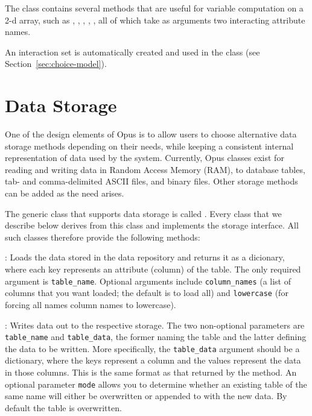 The  class contains several methods that are useful for
variable computation on a 2-d array, such as , ,
, , , all of which take 
as arguments two interacting attribute names.

An interaction set is automatically created and used in the
 class (see Section~\ref{sec:choice-model}).

\section{Data Storage}
\label{sec:data-storage}
%
One of the design elements of Opus is to allow users to choose alternative
data storage methods depending on their needs, while keeping a consistent
internal representation of data used by the system.  Currently, Opus classes
exist for reading and writing data in Random Access Memory (RAM), to database
tables, tab- and comma-delimited ASCII files, and binary files.  Other storage methods can
be added as the need arises.

The generic class that supports data storage is called
. Every class that we describe below derives from this class and
implements the storage interface. All such classes therefore provide the
following methods:

{\bf {}}: Loads the data stored in the data repository and
returns it as a dicionary, where each key represents an attribute (column) of
the table. The only required argument is \verb|table_name|. Optional
arguments include \verb|column_names| (a list of columns that you want loaded;
the default is to load all) and \verb|lowercase| (for forcing all names column
names to lowercase). 

{\bf {}}: Writes data out to the respective storage. The
two non-optional parameters are \verb|table_name| and \verb|table_data|, the
former naming the table and the latter defining the data to be written. More
specifically, the \verb|table_data| argument should be a dictionary, where
the keys represent a column and the values represent the data in those columns. 
This is the same format as that returned by the  method.
An optional parameter \verb|mode| allows you to determine whether an existing
table of the same name will either be overwritten or appended to with the new
data. By default the table is overwritten. 

